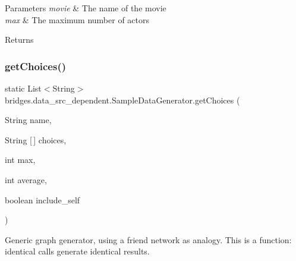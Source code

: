 \begin{DoxyParams}{Parameters}
{\em movie} & The name of the movie \\
\hline
{\em max} & The maximum number of actors \\
\hline
\end{DoxyParams}
\begin{DoxyReturn}{Returns}

\end{DoxyReturn}
\mbox{\label{classbridges_1_1data__src__dependent_1_1_sample_data_generator_a5b93af083c764f1046ebb6d1b9ae8d6f}} 
\subsubsection{\texorpdfstring{get\+Choices()}{getChoices()}}
{\footnotesize\ttfamily static List$<$String$>$ bridges.\+data\+\_\+src\+\_\+dependent.\+Sample\+Data\+Generator.\+get\+Choices (\begin{DoxyParamCaption}\item[{String}]{name,  }\item[{String \mbox{[}$\,$\mbox{]}}]{choices,  }\item[{int}]{max,  }\item[{int}]{average,  }\item[{boolean}]{include\+\_\+self }\end{DoxyParamCaption})\hspace{0.3cm}{\ttfamily [static]}}

Generic graph generator, using a friend network as analogy. This is a function\+: identical calls generate identical results.



